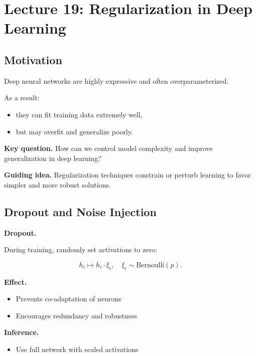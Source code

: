 \section{Lecture 19: Regularization in Deep Learning}

\subsection{Motivation}

Deep neural networks are highly expressive and often overparameterized.

\medskip

\noindent
As a result:
\begin{itemize}
    \item they can fit training data extremely well,
    \item but may overfit and generalize poorly.
\end{itemize}

\medskip

\noindent
\textbf{Key question.}  
How can we control model complexity and improve generalization in deep learning?

\medskip

\noindent
\textbf{Guiding idea.}  
Regularization techniques constrain or perturb learning to favor simpler and more robust solutions.

\subsection{Dropout and Noise Injection}

\textbf{Dropout.}

During training, randomly set activations to zero:

\[
h_i \mapsto h_i \cdot \xi_i, \quad \xi_i \sim \text{Bernoulli}(p).
\]

\medskip

\noindent
\textbf{Effect.}
\begin{itemize}
    \item Prevents co-adaptation of neurons
    \item Encourages redundancy and robustness
\end{itemize}

\medskip

\noindent
\textbf{Inference.}
\begin{itemize}
    \item Use full network with scaled activations
\end{itemize}

